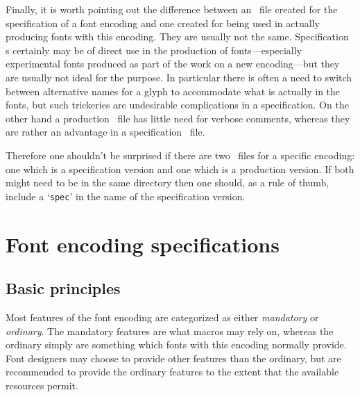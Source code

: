 \documentclass[a4paper]{article}
\DeclareRobustCommand\ETX{\textsmaller{ETX}}
\begin{document}
Finally, it is worth pointing out the difference between an \ETX\ file 
created for the specification of a font encoding and one created for 
being used in actually producing fonts with this encoding. They are 
usually not the same. Specification \ETX s certainly may be of direct 
use in the production of fonts---especially experimental fonts 
produced as part of the work on a new encoding---but they are usually 
not ideal for the purpose. In particular there is often a need to 
switch between alternative names for a glyph to accommodate what is 
actually in the fonts, but such trickeries are undesirable 
complications in a specification. On the other hand a production 
\ETX\ file has little need for verbose comments, whereas they are rather 
an advantage in a specification \ETX\ file.

Therefore one shouldn't be surprised if there are two \ETX\ files for a 
specific encoding: one which is a specification version and one which 
is a production version. If both might need to be in the same 
directory then one should, as a rule of thumb, include a 
`\texttt{spec}' in the name of the specification version.


\section{Font encoding specifications}

\subsection{Basic principles}

Most features of the font encoding are categorized as either 
\emph{mandatory} or \emph{ordinary}. The mandatory features are what 
macros may rely on, whereas the ordinary simply are something which 
fonts with this encoding normally provide. Font designers may choose 
to provide other features than the ordinary, but are recommended to 
provide the ordinary features to the extent that the available 
resources permit.
\end{document}
